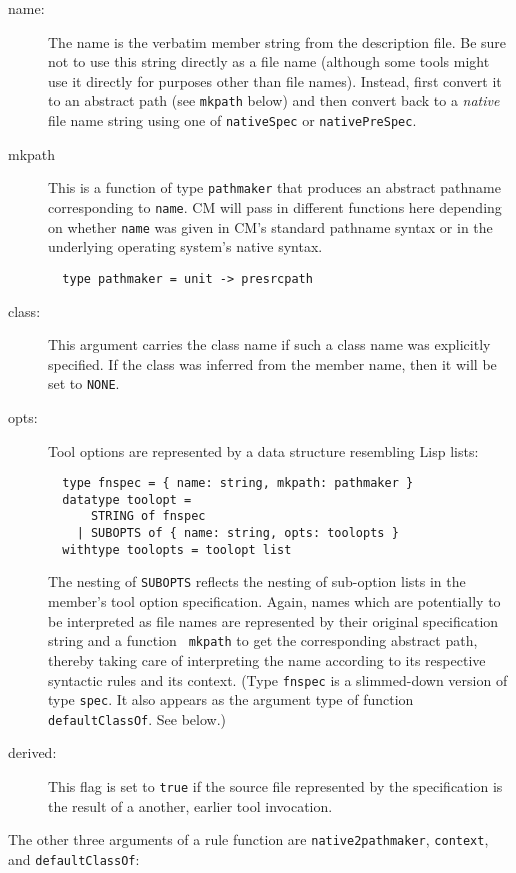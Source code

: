 \begin{description}
\item[name:] The name is the verbatim member string from the
description file.  Be sure not to use this string directly as a file
name (although some tools might use it directly for purposes other
than file names).  Instead, first convert it to an abstract path (see
{\tt mkpath} below) and then convert back to a {\em native} file name
string using one of {\tt nativeSpec} or {\tt nativePreSpec}.
\item[mkpath] This is a function of type {\tt pathmaker} that produces
an abstract pathname corresponding to {\tt name}.  CM will pass in different
functions here depending on whether {\tt name} was given in CM's
standard pathname syntax or in the underlying operating system's
native syntax.
\begin{lstlisting}
  type pathmaker = unit -> presrcpath
\end{lstlisting}%
\item[class:] This argument carries the class name if such a class
name was explicitly specified.  If the class was inferred from the
member name, then it will be set to {\tt NONE}.
\item[opts:] Tool options are represented by a data structure
resembling Lisp lists:
\begin{lstlisting}
  type fnspec = { name: string, mkpath: pathmaker }
  datatype toolopt =
      STRING of fnspec
    | SUBOPTS of { name: string, opts: toolopts }
  withtype toolopts = toolopt list
\end{lstlisting}%
The nesting of {\tt SUBOPTS} reflects the nesting of sub-option lists
in the member's tool option specification.
Again, names which are potentially to be interpreted as file names are
represented by their original specification string and a function {\tt
mkpath} to get the corresponding abstract path, thereby taking
care of interpreting the name according to its respective syntactic
rules and its context. (Type {\tt fnspec} is a slimmed-down version of
type {\tt spec}.  It also appears as the argument type of function
{\tt defaultClassOf}.  See below.)
\item[derived:] This flag is set to {\tt true} if the source file
represented by the specification is the result of a another, earlier
tool invocation.
\end{description}

The other three arguments of a rule function are {\tt native2pathmaker},
{\tt context}, and {\tt defaultClassOf}:

